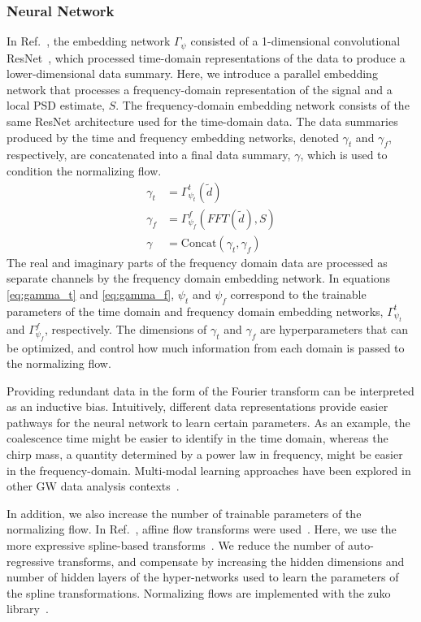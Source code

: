 \begin{refsection}
\subsubsection{Neural Network}
In Ref.~\cite{Chatterjee:2024pbj}, the \amplfi embedding network $\Gamma_\psi$ consisted of a 1-dimensional convolutional ResNet~\cite{resnet}, which processed time-domain representations of the data to produce a lower-dimensional data summary. 
Here, we introduce a parallel embedding network that processes a frequency-domain representation of the signal and a local PSD estimate, $S$. 
The frequency-domain embedding network consists of the same ResNet architecture used for the time-domain data. 
The data summaries produced by the time and frequency embedding networks, denoted $\gamma_t$ and $\gamma_f$, respectively, are concatenated into a final data summary, $\gamma$, which is used to condition the normalizing flow.
\begin{align}
    \gamma_t &= \Gamma_{\psi_t}^{t}(\tilde{d}) \\ \label{eq:gamma_t}
    \gamma_f &= \Gamma_{\psi_f}^{f}(FFT(\tilde{d}), S) \\ \label{eq:gamma_f}
    \gamma &= \text{Concat}(\gamma_t, \gamma_f)
\end{align}
The real and imaginary parts of the frequency domain data are processed as separate channels by the frequency domain embedding network. 
In equations \ref{eq:gamma_t} and \ref{eq:gamma_f}, $\psi_t$ and $\psi_f$ correspond to the trainable parameters of the time domain and frequency domain embedding networks, $\Gamma_{\psi_t}^{t}$ and $\Gamma_{\psi_f}^{f}$, respectively. 
The dimensions of $\gamma_t$ and $\gamma_f$ are hyperparameters that can be optimized, and control how much information from each domain is passed to the normalizing flow.


Providing redundant data in the form of the Fourier transform can be interpreted as an inductive bias. 
Intuitively, different data representations provide easier pathways for the neural network to learn certain parameters. 
As an example, the coalescence time might be easier to identify in the time domain, whereas the chirp mass, a quantity determined by a power law in frequency, might be easier in the frequency-domain. 
Multi-modal learning approaches have been explored in other GW data analysis contexts~\cite{PhysRevD.108.042004, Sun:2023vlq}.

In addition, we also increase the number of trainable parameters of the normalizing flow. 
In Ref.~\cite{Chatterjee:2024pbj}, affine flow transforms were used~\cite{realnvp}. 
Here, we use the more expressive spline-based transforms~\cite{spline3}. 
We reduce the number of auto-regressive transforms, and compensate by increasing the hidden dimensions and number of hidden layers of the hyper-networks used to learn the parameters of the spline transformations. 
Normalizing flows are implemented with the zuko library~\cite{rozet2022zuko}. 


\end{refsection}
